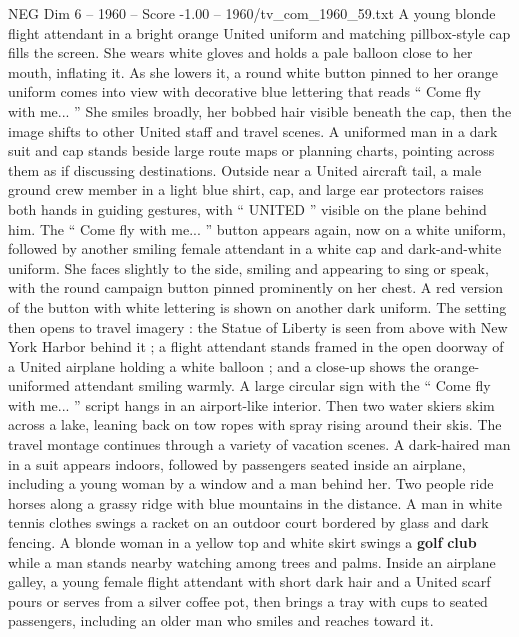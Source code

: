 \begin{textsample}{NEG Dim 6 – 1960 – Score -1.00 – 1960/tv\_com\_1960\_59.txt}  \label{ex:f6_neg_074}
A young blonde flight attendant in a bright orange United uniform and matching pillbox-style cap fills the screen.
She wears white gloves and holds a pale balloon close to her mouth, inflating it.
As she lowers it, a round white button pinned to her orange uniform comes into view with decorative blue lettering that reads “ Come fly with me... ” She smiles broadly, her bobbed hair visible beneath the cap, then the image shifts to other United staff and travel scenes.
A uniformed man in a dark suit and cap stands beside large route maps or planning charts, pointing across them as if discussing destinations.
Outside near a United aircraft tail, a male ground crew member in a light blue shirt, cap, and large ear protectors raises both hands in guiding gestures, with “ UNITED ” visible on the plane behind him.
The “ Come fly with me... ” button appears again, now on a white uniform, followed by another smiling female attendant in a white cap and dark-and-white uniform.
She faces slightly to the side, smiling and appearing to sing or speak, with the round campaign button pinned prominently on her chest.
A red version of the button with white lettering is shown on another dark uniform.
The setting then opens to travel imagery : the Statue of Liberty is seen from above with New York Harbor behind it ; a flight attendant stands framed in the open doorway of a United airplane holding a white balloon ; and a close-up shows the orange-uniformed attendant smiling warmly.
A large circular sign with the “ Come fly with me... ” script hangs in an airport-like interior.
Then two water skiers skim across a lake, leaning back on tow ropes with spray rising around their skis.
The travel montage continues through a variety of vacation scenes.
A dark-haired man in a suit appears indoors, followed by passengers seated inside an airplane, including a young woman by a window and a man behind her.
Two people ride horses along a grassy ridge with blue mountains in the distance.
A man in white tennis clothes swings a racket on an outdoor court bordered by glass and dark fencing.
A blonde woman in a yellow top and white skirt swings a \textbf{golf} \textbf{club} while a man stands nearby watching among trees and palms.
Inside an airplane galley, a young female flight attendant with short dark hair and a United scarf pours or serves from a silver coffee pot, then brings a tray with cups to seated passengers, including an older man who smiles and reaches toward it.

\end{textsample}
